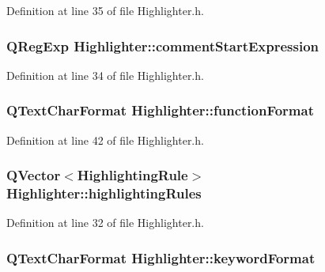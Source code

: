 Definition at line 35 of file Highlighter.\-h.

\hypertarget{class_highlighter_a67cdecd667929b4eefbc7057d58cd90b}{
\subsubsection[{comment\-Start\-Expression}]{\setlength{\rightskip}{0pt plus 5cm}Q\-Reg\-Exp Highlighter\-::comment\-Start\-Expression\hspace{0.3cm}{\ttfamily [private]}}}\label{class_highlighter_a67cdecd667929b4eefbc7057d58cd90b}


Definition at line 34 of file Highlighter.\-h.

\hypertarget{class_highlighter_a7e02cd8caee678c1256998c88d30e241}{
\subsubsection[{function\-Format}]{\setlength{\rightskip}{0pt plus 5cm}Q\-Text\-Char\-Format Highlighter\-::function\-Format\hspace{0.3cm}{\ttfamily [private]}}}\label{class_highlighter_a7e02cd8caee678c1256998c88d30e241}


Definition at line 42 of file Highlighter.\-h.

\hypertarget{class_highlighter_aa23f8b3f4ddd1354f508b46d77897fe5}{
\subsubsection[{highlighting\-Rules}]{\setlength{\rightskip}{0pt plus 5cm}Q\-Vector$<${\bf Highlighting\-Rule}$>$ Highlighter\-::highlighting\-Rules\hspace{0.3cm}{\ttfamily [private]}}}\label{class_highlighter_aa23f8b3f4ddd1354f508b46d77897fe5}


Definition at line 32 of file Highlighter.\-h.

\hypertarget{class_highlighter_acf807339a8cd02097a81e455ef2686d2}{
\subsubsection[{keyword\-Format}]{\setlength{\rightskip}{0pt plus 5cm}Q\-Text\-Char\-Format Highlighter\-::keyword\-Format\hspace{0.3cm}{\ttfamily [private]}}}\label{class_highlighter_acf807339a8cd02097a81e455ef2686d2}


